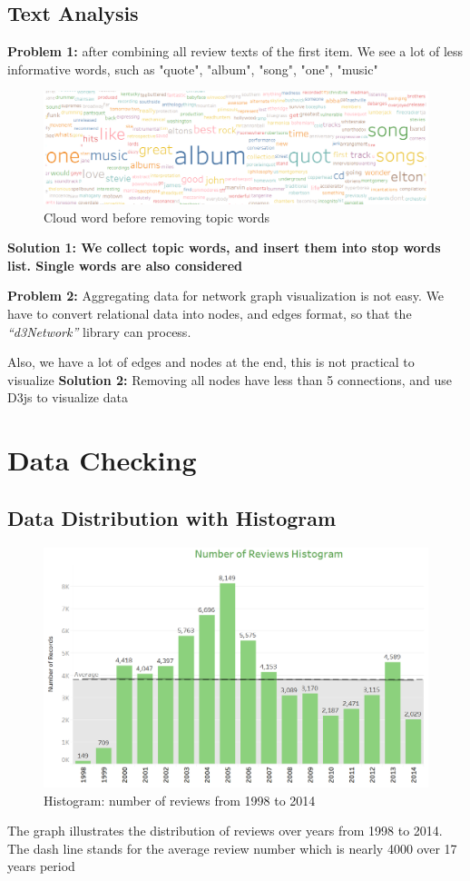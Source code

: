 \documentclass[a4paper,11pt]{article}
\begin{document}
	\subsection{Text Analysis}
	\textbf{Problem 1:} after combining all review texts of the first item. We see a lot of less informative words, such as "quote", "album", "song", "one", "music"
	\begin{figure}[H]
		\includegraphics[width=1\textwidth, center]{pic6}
		\caption{Cloud word before removing topic words}
	\end{figure}	
	\textbf{Solution 1: We collect topic words, and insert them into stop words list. Single words are also considered}
	
	\textbf{Problem 2:} Aggregating data for network graph visualization is not easy. We have to convert relational data into nodes, and edges format, so that the \textit{“d3Network”} library can process. 
	
	Also, we have a lot of edges and nodes at the end, this is not practical to visualize
	\textbf{Solution 2:} Removing all nodes have less than 5 connections, and use D3js to visualize data
	
\section{Data Checking}
	\subsection{Data Distribution with Histogram}
		\begin{figure}[H]
			\includegraphics[width=1\textwidth, center]{pic7}
			\caption{Histogram: number of reviews from 1998 to 2014}
		\end{figure}	
		The graph illustrates the distribution of reviews over years from 1998 to 2014. The dash line stands for the average review number which is nearly 4000 over 17 years period
		
\end{document}
